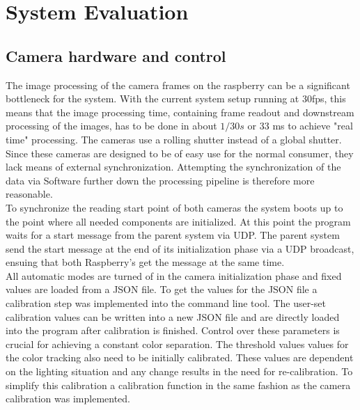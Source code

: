 \section{System Evaluation}
\subsection{Camera hardware and control}
The image  processing of the camera frames on the raspberry can be a significant bottleneck for the system. With the current system setup running at 30fps, this means that the image processing time, containing frame readout and downstream processing of the images, has to be done in about $1/30s$ or 33 ms to achieve "real time" processing. The cameras use a rolling shutter instead of a global shutter. Since these cameras are designed to be of easy use for the normal consumer, they lack means of external synchronization. Attempting the synchronization of the data via Software further down the processing pipeline is therefore more reasonable.
\\To synchronize the reading start point of both cameras the system boots up to the point where all needed components are initialized. At this point the program waits for a start message from the parent system via UDP. The parent system send the start message at the end of its initialization phase via a UDP broadcast, ensuing that both Raspberry's get the message at the same time.\\
All automatic modes are turned of in the camera initialization phase and fixed values are loaded from a JSON file. To get the values for the JSON file a calibration step was implemented into the command line tool. The user-set calibration values can be written into a new JSON file and are directly loaded into the program after calibration is finished. Control over these parameters is crucial for achieving a constant color separation. The threshold values values for the color tracking also need to be initially calibrated. These values are dependent on the lighting situation and any change results in the need for re-calibration. To simplify this calibration a calibration function in the same fashion as the camera calibration was implemented.
